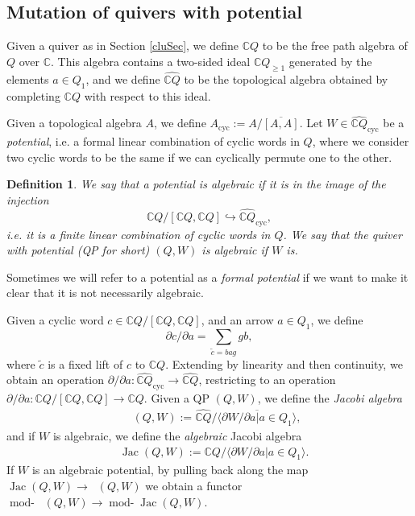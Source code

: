 \documentclass[a4paper,10pt]{amsart}
\newtheorem{definition}[theorem]{Definition}
\DeclareMathOperator{\cyc}{cyc}
\DeclareMathOperator{\tmod}{mod-}
\newcommand{\rmod}[1]{\tmod\!#1}
\DeclareMathOperator{\Jac}{Jac}
\DeclareMathOperator{\HJac}{\widehat{Jac}}
\begin{document}
\subsection{Mutation of quivers with potential}
\label{mutPot}
Given a quiver as in Section \ref{cluSec}, we define $\mathbb{C}Q$ to be the free path algebra of $Q$ over $\mathbb{C}$.  This algebra contains a two-sided ideal $\mathbb{C}Q_{\geq 1}$ generated by the elements $a\in Q_1$, and we define $\widehat{\mathbb{C}Q}$ to be the topological algebra obtained by completing $\mathbb{C}Q$ with respect to this ideal.

Given a topological algebra $A$, we define $A_{\cyc}:=A/\overline{[A,A]}$.  Let $W\in \widehat{\mathbb{C}Q}_{\cyc}$ be a \textit{potential}, i.e. a formal linear combination of cyclic words in $Q$, where we consider two cyclic words to be the same if we can cyclically permute one to the other.  
\begin{definition}
\label{algDef}
We say that a potential is \textit{algebraic} if it is in the image of the injection
\[
\mathbb{C}Q/[\mathbb{C}Q,\mathbb{C}Q]\hookrightarrow \widehat{\mathbb{C}Q}_{\cyc},
\]
i.e. it is a finite linear combination of cyclic words in $Q$.  We say that the quiver with potential (QP for short) $(Q,W)$ is algebraic if $W$ is.
\end{definition}
Sometimes we will refer to a potential as a \textit{formal potential} if we want to make it clear that it is not necessarily algebraic.

Given a cyclic word $c\in \mathbb{C}Q/[\mathbb{C}Q,\mathbb{C}Q]$, and an arrow $a\in Q_1$, we define
\[
\partial c/\partial a=\sum_{\tilde{c}=bag}gb,
\]
where $\tilde{c}$ is a fixed lift of $c$ to $\mathbb{C}Q$.  Extending by linearity and then continuity, we obtain an operation $\partial/\partial a \colon \widehat{\mathbb{C}Q}_{\cyc}\rightarrow \widehat{\mathbb{C}Q}$, restricting to an operation $\partial/\partial a\colon \mathbb{C}Q/[\mathbb{C}Q,\mathbb{C}Q]\rightarrow \mathbb{C}Q$.  Given a QP $(Q,W)$, we define the \textit{Jacobi algebra}
\begin{align*}
&\HJac(Q,W):=\widehat{\mathbb{C}Q}/\overline{\langle \partial W/\partial a|a\in Q_1\rangle},
\end{align*}
and if $W$ is algebraic, we define the \textit{algebraic} Jacobi algebra
\begin{align*}
&\Jac(Q,W):=\mathbb{C}Q/\langle \partial W/\partial a|a\in Q_1\rangle.
\end{align*}
If $W$ is an algebraic potential, by pulling back along the map $\Jac(Q,W)\rightarrow \HJac(Q,W)$ we obtain a functor $\rmod{\HJac(Q,W)}\rightarrow \rmod{\Jac(Q,W)}$.  
\end{document}
